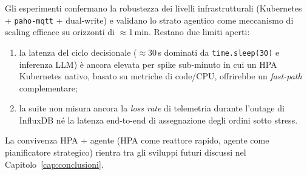 Gli esperimenti confermano la robustezza dei livelli infrastrutturali (Kubernetes + \texttt{paho-mqtt} + dual-write) e validano lo strato agentico come meccanismo di scaling efficace su orizzonti di $\approx$1\,min. Restano due limiti aperti:
\begin{enumerate}
    \item la latenza del ciclo decisionale ($\approx$30\,s dominati da \texttt{time.sleep(30)} e inferenza LLM) è ancora elevata per spike sub-minuto in cui un HPA Kubernetes nativo, basato su metriche di code/CPU, offrirebbe un \emph{fast-path} complementare;
    \item la suite non misura ancora la \textit{loss rate} di telemetria durante l'outage di InfluxDB né la latenza end-to-end di assegnazione degli ordini sotto stress.
\end{enumerate}
La convivenza HPA + agente (HPA come reattore rapido, agente come pianificatore strategico) rientra tra gli sviluppi futuri discussi nel Capitolo~\ref{cap:conclusioni}.
